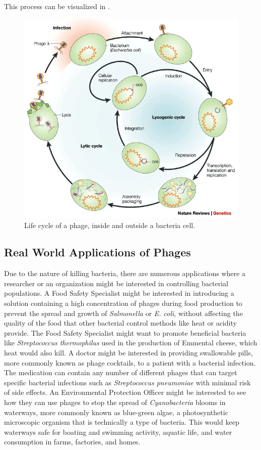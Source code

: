 This process can be visualized in . \cite{campbellFutureBacteriophageBiology2003}
\begin{figure}
    \centering
    \includegraphics[width=0.5\linewidth]{Chapters/Figures/phage_life_cycle.png}
    \caption{Life cycle of a phage, inside and outside a bacteria cell.}
    \label{fig:phage_life_cycle}
\end{figure}

\subsection{Real World Applications of Phages}
Due to the nature of killing bacteria, there are numerous applications where a researcher or an organization might be interested in controlling bacterial populations. A Food Safety Specialist might be interested in introducing a solution containing a high concentration of phages during food production to prevent the spread and growth of \textit{Salmonella} or \textit{E. coli}, without affecting the quality of the food that other bacterial control methods like heat or acidity provide. The Food Safety Specialist might want to promote beneficial bacteria like \textit{Streptococcus thermophilus} used in the production of Emmental cheese, which heat would also kill. A doctor might be interested in providing swallowable pills, more commonly known as phage cocktails, to a patient with a bacterial infection. The medication can contain any number of different phages that can target specific bacterial infections such as \textit{Streptococcus pneumoniae} with minimal risk of side effects. An Environmental Protection Officer might be interested to see how they can use phages to stop the spread of \textit{Cyanobacteria} blooms in waterways, more commonly known as blue-green algae, a photosynthetic microscopic organism that is technically a type of bacteria. This would keep waterways safe for boating and swimming activity, aquatic life, and water consumption in farms, factories, and homes. 


